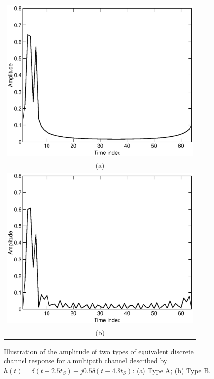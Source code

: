 \documentclass[11pt,draftnofoot,onecolumn]{IEEEtran}
\begin{document}
\begin{figure}[t]
\centering
\begin{tabular}{c}
\includegraphics[height=3.2in]{fig/fig_equivalent_ch1.eps} \\
(a) \\
\includegraphics[height=3.2in]{fig/fig_equivalent_ch2.eps} \\
(b)
\end{tabular}
\caption{Illustration of the amplitude of two types of equivalent
discrete channel response for a multipath channel described by $h(t)
= \delta(t - 2.5 t_S) - j 0.5 \delta(t - 4.8 t_S)$: (a) Type A; (b)
Type B.} \label{fig_siso_equivalent_ch}
\end{figure}
\end{document}
